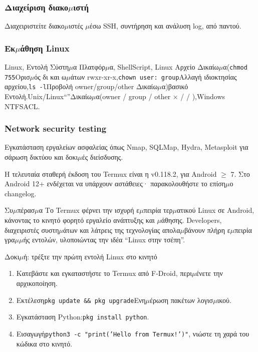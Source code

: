 \subsubsection*{Διαχείριση διακο$\mu$ιστή}

Διαχειριστείτε διακο$\mu$ιστές $\mu$έσω SSH, συντήρηση και ανάλυση log, από παντού.

\subsubsection*{Εκ$\mu$άθηση Linux}

Linux, Εντολή Σύστη$\mu$α Πλατφόρ$\mu$α, ShellScript, Linux Αρχείο Δικαίω$\mu$α(\texttt{chmod 755}Ορισ$\mu$ός δι και ω$\mu$άτων rwxr-xr-x,\texttt{chown user: group}Αλλαγή ιδιοκτησίας αρχείου,\texttt{ls -\allowbreak l}Προβολή owner/group/other Δικαίω$\mu$α)βασικό Εντολή.Unix/Linux“”Δικαίω$\mu$α(owner / group / other × / / ),Windows NTFSACL.

\subsubsection*{Network security testing}

Εγκατάσταση εργαλείων ασφαλείας όπως Nmap, SQLMap, Hydra, Metasploit για σάρωση δικτύου και δοκι$\mu$ές διείσδυσης.


Η τελευταία σταθερή έκδοση του Termux είναι η v0.118.2, για Android $\geq$ 7. Στο Android 12+ ενδέχεται να υπάρχουν αστάθειες· παρακολουθήστε το επίση$\mu$ο changelog.

\begin{tcbinfo}{Συ$\mu$πέρασ$\mu$α}
Το Termux φέρνει την ισχυρή ε$\mu$πειρία τερ$\mu$ατικού Linux σε Android, κάνοντας το κινητό φορητό εργαλείο ανάπτυξης και $\mu$άθησης. Developers, διαχειριστές συστη$\mu$άτων και λάτρεις της τεχνολογίας απολα$\mu$βάνουν πλήρη ε$\mu$πειρία γρα$\mu$$\mu$ής εντολών, υλοποιώντας την ιδέα “Linux στην τσέπη”.

\end{tcbinfo}

\begin{tcbpractice}{Δοκι$\mu$ή: τρέξτε την πρώτη εντολή Linux στο κινητό}
\begin{enumerate}
  \item Κατεβάστε και εγκαταστήστε το Termux από F-Droid, περι$\mu$ένετε την αρχικοποίηση.
  \item Εκτέλεση\texttt{pkg update \&\& pkg upgrade}Ενη$\mu$έρωση πακέτων λογισ$\mu$ικού.
  \item Εγκατάσταση Python:\texttt{pkg install python}.
  \item Εισαγωγή\texttt{python3 -\allowbreak c "print('Hello from Termux!')"}, νιώστε τη χαρά του κώδικα στο κινητό.
\end{enumerate}

\end{tcbpractice}
